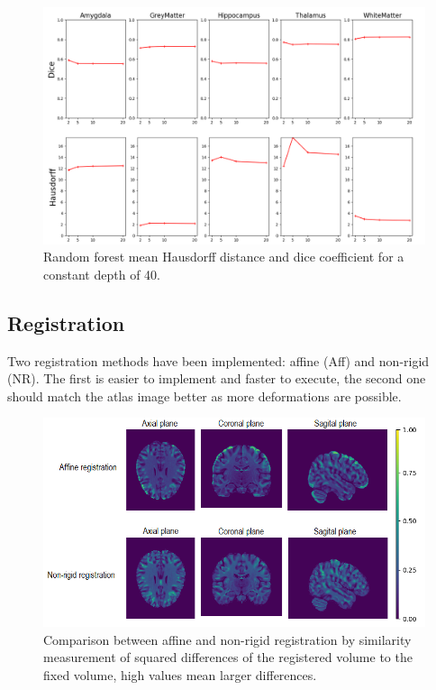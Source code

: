 \begin{figure}[h!]
	\centering
	\includegraphics[width=\linewidth]{img/plotMLOptEstimator2}
	\caption{Random forest  mean Hausdorff distance and dice coefficient for a constant depth of 40.}
	\label{fig:MLOptEst}
\end{figure}

\subsection*{Registration}
Two registration methods have been implemented: affine (Aff) and non-rigid (NR). The first is easier to implement and faster to execute, the second one should match the atlas image better as more deformations are possible.

\begin{figure}[h!]
	\centering
	\includegraphics[width=\linewidth]{img/compareRegistration2}
	\caption{Comparison between affine and non-rigid registration by similarity measurement of squared differences of the registered volume to the fixed volume, high values mean larger differences.}
	\label{fig:compareregistration}
\end{figure}

